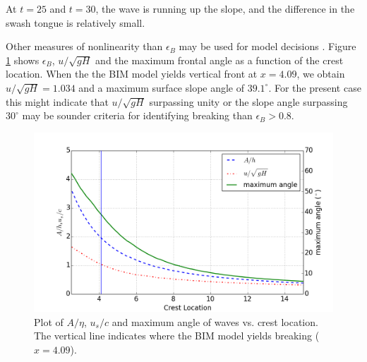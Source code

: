 \documentclass[review]{elsarticle}
\begin{document}
At $t=25$ and $t=30$, the wave is running up the slope, 
and the difference in the swash tongue is relatively small. 

Other measures of nonlinearity than $\epsilon_B$ may be used for model decisions 
\citep{lynett2006nearshore,matsuyama2007study}. Figure \ref{fig:wave_break_criteria} shows 
$\epsilon_B$, $u/\sqrt{gH}$ and the maximum frontal angle 
as a function of the crest location.
When the the BIM model yields vertical front at $x=4.09$, 
we obtain $u/\sqrt{gH} = 1.034$ and a maximum surface slope angle of $39.1^\circ$. 
For the present case this might indicate 
that $u/\sqrt{gH}$ surpassing unity or 
the slope angle surpassing  
$30^\circ$ may be sounder criteria for identifying breaking than $\epsilon_B>0.8$.
 
\begin{figure}[tbh!]
\centering
\includegraphics[width=.7\textwidth]{_fig/wave_break}
\caption{Plot of $A/\eta$, $u_s/c$ and maximum angle of waves vs. crest location. 
The vertical line indicates where the BIM model yields breaking ($x=4.09$). }
\label{fig:wave_break_criteria}
\end{figure}
\end{document}

